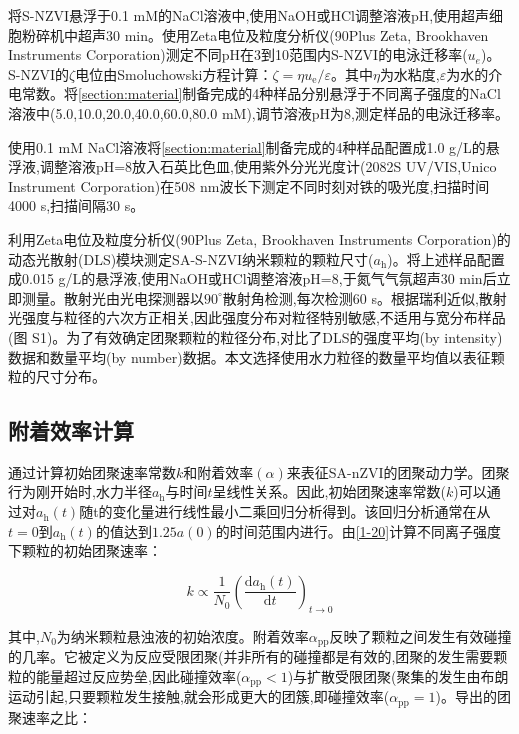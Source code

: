 将S-NZVI悬浮于0.1 mM的NaCl溶液中,使用NaOH或HCl调整溶液pH,使用超声细胞粉碎机中超声30 min。使用Zeta电位及粒度分析仪(90Plus Zeta, Brookhaven Instruments Corporation)测定不同pH在3到10范围内S-NZVI的电泳迁移率($u_e$)。S-NZVI的$\zeta$电位由Smoluchowski方程计算：$\zeta=\eta u_\mathrm{e}/\varepsilon$。其中$\eta$为水粘度,$\varepsilon$为水的介电常数。将\cref{section:material}制备完成的4种样品分别悬浮于不同离子强度的NaCl溶液中(5.0,10.0,20.0,40.0,60.0,80.0 mM),调节溶液pH为8,测定样品的电泳迁移率。

使用0.1 mM NaCl溶液将\cref{section:material}制备完成的4种样品配置成1.0 g/L的悬浮液,调整溶液pH=8放入石英比色皿,使用紫外分光光度计(2082S UV/VIS,Unico Instrument Corporation)在508 nm波长下测定不同时刻对铁的吸光度,扫描时间4000 s,扫描间隔30 s。
    
利用Zeta电位及粒度分析仪(90Plus Zeta, Brookhaven Instruments Corporation)的动态光散射(DLS)模块测定SA-S-NZVI纳米颗粒的颗粒尺寸($a_\mathrm{h}$)。将上述样品配置成0.015 g/L的悬浮液,使用NaOH或HCl调整溶液pH=8,于氮气气氛超声30 min后立即测量。散射光由光电探测器以$90^\circ$散射角检测,每次检测60 s。根据瑞利近似,散射光强度与粒径的六次方正相关,因此强度分布对粒径特别敏感,不适用与宽分布样品(图 S1)。为了有效确定团聚颗粒的粒径分布,对比了DLS的强度平均(by intensity)数据和数量平均(by number)数据。本文选择使用水力粒径的数量平均值以表征颗粒的尺寸分布。


\subsection{附着效率计算}

通过计算初始团聚速率常数$k$和附着效率$(\alpha)$来表征SA-nZVI的团聚动力学。团聚行为刚开始时,水力半径$a_\mathrm{h}$与时间$t$呈线性关系。因此,初始团聚速率常数($k$)可以通过对$a_\mathrm{h}(t)$随t的变化量进行线性最小二乘回归分析得到。该回归分析通常在从$t = 0$到$a_\mathrm{h}(t)$的值达到$1.25a(0)$的时间范围内进行\cite{ChenElimelech-762}。由\cref{1-20}计算不同离子强度下颗粒的初始团聚速率\cite{ChenMylon-760}：

\begin{equation}\label{1-20}
    k\propto\frac{1}{N_0}\left(\frac{\mathrm{d}a_\mathrm{h}(t)}{\mathrm{d}t}\right)_{t\rightarrow0}
\end{equation}

其中,$N_0$为纳米颗粒悬浊液的初始浓度。附着效率$\alpha_{\mathrm {pp}}$反映了颗粒之间发生有效碰撞的几率。它被定义为反应受限团聚(并非所有的碰撞都是有效的,团聚的发生需要颗粒的能量超过反应势垒,因此碰撞效率($\alpha_\mathrm{pp}<1$)与扩散受限团聚(聚集的发生由布朗运动引起,只要颗粒发生接触,就会形成更大的团簇,即碰撞效率($\alpha_\mathrm{pp}=1$)。导出的团聚速率之比\cite{doi:10.1021/la062072v}：

